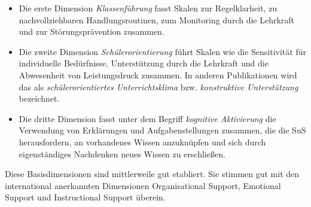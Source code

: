 \begin{itemize}
\item
Die erste Dimension \emph{Klassenf{\"u}hrung} fasst Skalen zur Regelklarheit, zu nachvollziehbaren Handlungsroutinen, zum Monitoring durch die Lehrkraft und zur St{\"o}rungspr{\"a}vention zusammen.

\item
Die zweite Dimension \emph{Sch{\"u}lerorientierung} f{\"u}hrt Skalen wie die Sensitivit{\"a}t f{\"u}r individuelle Bed{\"u}rfnisse, Unterst{\"u}tzung durch die Lehrkraft und die Abwesenheit von Leistungsdruck zusammen. In anderen Publikationen wird das als \emph{sch{\"u}lerorientiertes Unterrichtsklima} bzw. \emph{konstruktive Unterst{\"u}tzung} bezeichnet.

\item
Die dritte Dimension fasst unter dem Begriff \emph{kognitive Aktivierung} die Verwendung von Erkl{\"a}rungen und Aufgabenstellungen zusammen, die die SuS herausfordern, an vorhandenes Wissen anzukn{\"u}pfen und sich durch eigenst{\"a}ndiges Nachdenken neues Wissen zu erschlie{\ss}en.
\end{itemize}

Diese Basisdimensionen sind mittlerweile gut etabliert. Sie stimmen gut mit den international anerkannten Dimensionen {\glqq}Organisational Support{\grqq}, {\glqq}Emotional Support{\grqq} und  {\glqq}Instructional Support{\grqq} {\"u}berein.

\bip\bip
